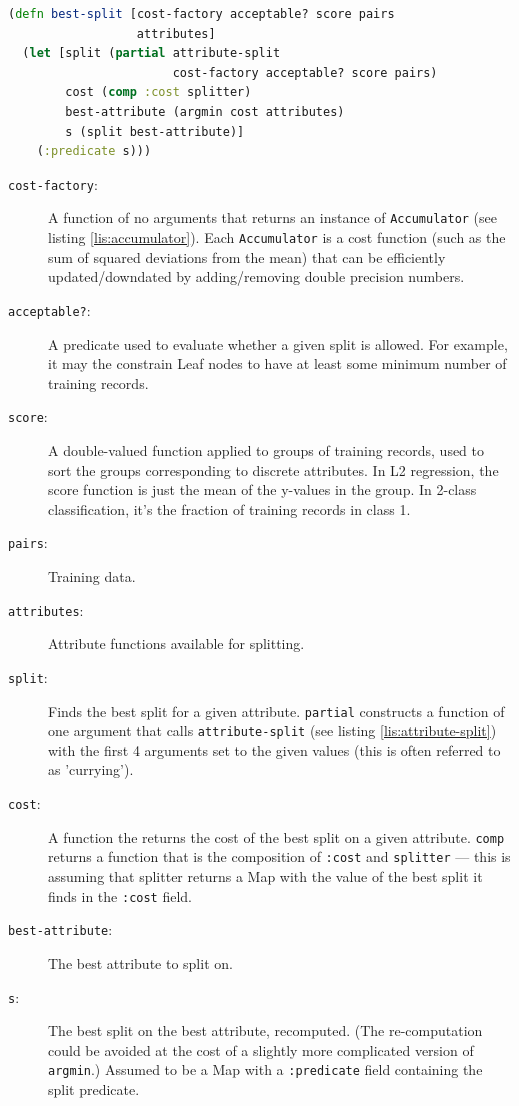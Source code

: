 \documentclass[10pt,openany]{article}
\numberwithin{definition}{section}
\numberwithin{example}{section}
\numberwithin{equation}{section}
\numberwithin{figure}{section}
\begin{document}
\begin{minipage}[t]{1\columnwidth}%
\begin{lstlisting}[caption={Split optimization entry point},label={lis:best-split},language=clojure,tabsize=2]
(defn best-split [cost-factory acceptable? score pairs 
                  attributes]
  (let [split (partial attribute-split 
                       cost-factory acceptable? score pairs) 
        cost (comp :cost splitter)
        best-attribute (argmin cost attributes)
        s (split best-attribute)]
    (:predicate s))) 
\end{lstlisting}
%
\end{minipage}
\begin{description}
\item [{\texttt{cost-factory}:}] A function of no arguments that returns
an instance of \texttt{Accumulator} (see listing \ref{lis:accumulator}).
Each \texttt{Accumulator} is a cost function (such as the sum of squared
deviations from the mean) that can be efficiently updated/downdated
by adding/removing double precision numbers.
\item [{\texttt{acceptable?}:}] A predicate used to evaluate whether a
given split is allowed. For example, it may the constrain Leaf nodes
to have at least some minimum number of training records.
\item [{\texttt{score}:}] A double-valued function applied to groups of
training records, used to sort the groups corresponding to discrete
attributes. In L2 regression, the score function is just the mean
of the y-values in the group. In 2-class classification, it's the
fraction of training records in class 1.
\item [{\texttt{pairs}:}] Training data.
\item [{\texttt{attributes}:}] Attribute functions available for splitting.
\item [{\texttt{split}:}] Finds the best split for a given attribute. \texttt{partial}
constructs a function of one argument that calls \texttt{attribute-split}
(see listing \ref{lis:attribute-split}) with the first 4 arguments
set to the given values (this is often referred to as 'currying').
\item [{\texttt{cost}:}] A function the returns the cost of the best split
on a given attribute. \texttt{comp} returns a function that is the
composition of \texttt{:cost} and \texttt{splitter} --- this is assuming
that splitter returns a Map with the value of the best split it finds
in the \texttt{:cost} field.
\item [{\texttt{best-attribute}:}] The best attribute to split on. 
\item [{\texttt{s}:}] The best split on the best attribute, recomputed.
(The re-computation could be avoided at the cost of a slightly more
complicated version of \texttt{argmin}.) Assumed to be a Map with
a \texttt{:predicate} field containing the split predicate.\end{description}
\end{document}
